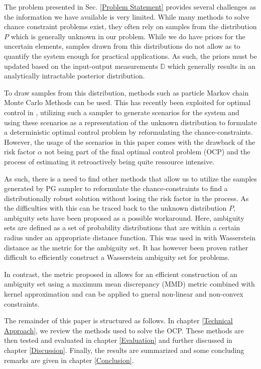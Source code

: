 
The problem presented in Sec. \ref{Problem Statement} provides several challenges as the information we have available is very limited. While many methods to solve chance constraint problems exist, they often rely on samples from the distribution $P$ which is generally unknown in our problem. While we do have priors for the uncertain elements, samples drawn from this distributions do not allow as to quantify the system enough for practical applications. As such, the priors must be updated based on the input-output measurements $\mathbb{D}$ which generally results in an analytically intractable posterior distribution.

To draw samples from this distribution, methods such as particle Markov chain Monte Carlo Methods \cite{Andrieu_10} can be used. This has recently been exploited for optimal control in \cite{Robert_24} , utilizing such a sampler to generate scenarios for the system and using these scenarios as a representation of the unknown distribution to formulate a deterministic optimal control problem by reformulating the chance-constraints. However, the usage of the scenarios in this paper comes with the drawback of the risk factor $\alpha$ not being part of the final optimal control problem (OCP) and the process of estimating it retroactively being quite ressource intensive.

As such, there is a need to find other methods that allow us to utilize the samples generated by PG sampler to reformulate the chance-constraints to find a distributionally robust solution without losing the risk factor in the process. As the difficulties with this can be traced back to the unknown distribution $P$, ambiguity sets have been proposed as a possible workaround. Here, ambiguity sets are defined as a set of probability distributions that are within a certain radius under an appropriate distance function. This was used in \cite{Hota_19} with Wasserstein distance as the metric for the ambiguity set. It has however been proven rather difficult to efficiently construct a Wasserstein ambiguity set for problems. 

In contrast, the metric proposed in \cite{Yassine_22} allows for an efficient construction of an ambiguity set using a maximum mean discrepancy (MMD) metric combined with kernel approximation and can be applied to gneral non-linear and non-convex constraints.

The remainder of this paper is structured as follows. In chapter \ref{Technical Approach}, we review the methods used to solve the OCP. These methods are then tested and evaluated in chapter \ref{Evaluation} and further discussed in chapter \ref{Discussion}. Finally, the results are summarized and some concluding remarks are given in chapter \ref{Conclusion}.



